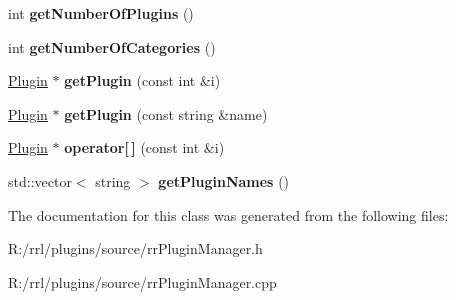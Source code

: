 \begin{DoxyCompactItemize}
\item 
\hypertarget{classrrp_1_1_plugin_manager_a593a127eb55d372ff96d917a8464ec92}{int {\bfseries get\-Number\-Of\-Plugins} ()}\label{classrrp_1_1_plugin_manager_a593a127eb55d372ff96d917a8464ec92}

\item 
\hypertarget{classrrp_1_1_plugin_manager_a74801e3f0fbf1bb07917ae4817f18b53}{int {\bfseries get\-Number\-Of\-Categories} ()}\label{classrrp_1_1_plugin_manager_a74801e3f0fbf1bb07917ae4817f18b53}

\item 
\hypertarget{classrrp_1_1_plugin_manager_ad8ca9cae07cbf8a65ff53d45ce17bc9e}{\hyperlink{classrrp_1_1_plugin}{Plugin} $\ast$ {\bfseries get\-Plugin} (const int \&i)}\label{classrrp_1_1_plugin_manager_ad8ca9cae07cbf8a65ff53d45ce17bc9e}

\item 
\hypertarget{classrrp_1_1_plugin_manager_aed01ed17916eb08db5eca64f30766365}{\hyperlink{classrrp_1_1_plugin}{Plugin} $\ast$ {\bfseries get\-Plugin} (const string \&name)}\label{classrrp_1_1_plugin_manager_aed01ed17916eb08db5eca64f30766365}

\item 
\hypertarget{classrrp_1_1_plugin_manager_ab81e15e03bd8dfd6e7ccf51db4a55f90}{\hyperlink{classrrp_1_1_plugin}{Plugin} $\ast$ {\bfseries operator\mbox{[}$\,$\mbox{]}} (const int \&i)}\label{classrrp_1_1_plugin_manager_ab81e15e03bd8dfd6e7ccf51db4a55f90}

\item 
\hypertarget{classrrp_1_1_plugin_manager_af576a9a1b36be2eff938c054d48029bb}{std\-::vector$<$ string $>$ {\bfseries get\-Plugin\-Names} ()}\label{classrrp_1_1_plugin_manager_af576a9a1b36be2eff938c054d48029bb}

\end{DoxyCompactItemize}


The documentation for this class was generated from the following files\-:\begin{DoxyCompactItemize}
\item 
R\-:/rrl/plugins/source/rr\-Plugin\-Manager.\-h\item 
R\-:/rrl/plugins/source/rr\-Plugin\-Manager.\-cpp\end{DoxyCompactItemize}
